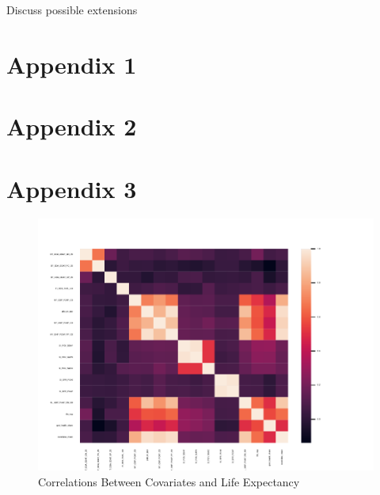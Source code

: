 \documentclass[12pt]{article}
\begin{document}
        Discuss possible extensions

    \clearpage
    \newpage

    
    

    \clearpage \newpage

    \appendix

    \section*{Appendix 1}

        
        
        
    \section*{Appendix 2}


        
        
        


    \section*{Appendix 3}

        \begin{figure}[h!]
            \centering
            \caption{Correlations Between Covariates and Life Expectancy}
            \label{LE_Health_Econ_Correlations}	
            \includegraphics[width=\linewidth,keepaspectratio=true]{../Output/Figures/LE_Health_Econ_Correlations_combined_short.pdf}
        \end{figure}
\end{document}
